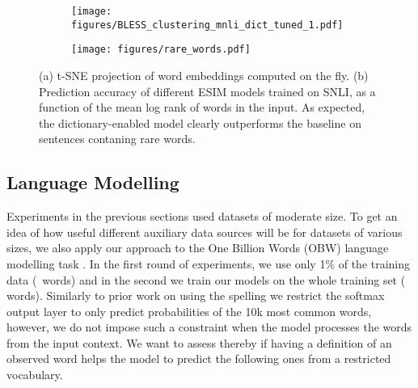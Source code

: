 \begin{figure}
  \begin{subfigure}[c]{0.5\textwidth}
    \texttt{[image: figures/BLESS\_clustering\_mnli\_dict\_tuned\_1.pdf]}
    \caption{\label{fig:SNLI_plot}}
  \end{subfigure}
  \begin{subfigure}[c]{0.5\textwidth}
    \texttt{[image: figures/rare\_words.pdf]}
    \caption{\label{fig:SNLI_rare_words}}
  \end{subfigure}
  \caption{
    (a) t-SNE projection of word embeddings computed on the fly. 
    (b) Prediction accuracy of different ESIM models trained on SNLI, as a function of the mean log rank of words in the input. As expected, the dictionary-enabled model clearly outperforms the baseline on sentences contaning rare words. 
  }
\end{figure}

\subsection{Language Modelling}
\label{sec:lm}
Experiments in the previous sections used datasets of moderate size. To get an idea of how useful different auxiliary data sources will be for datasets of various sizes, we also apply our approach to the One Billion Words (OBW) language modelling task \citep{chelba2014obw}. In the first round of experiments, we use only 1\% of the training data (~words) and in the second we train our models on the whole training set ( words). Similarly to prior work on using the spelling \citep{ling2015finding} we restrict the softmax output layer to only predict probabilities of the 10k most common words, however, we do not impose such a constraint when the model processes the words from the input context. 
We want to assess thereby if having a definition of an observed word helps the model to predict the following ones from a restricted vocabulary.





